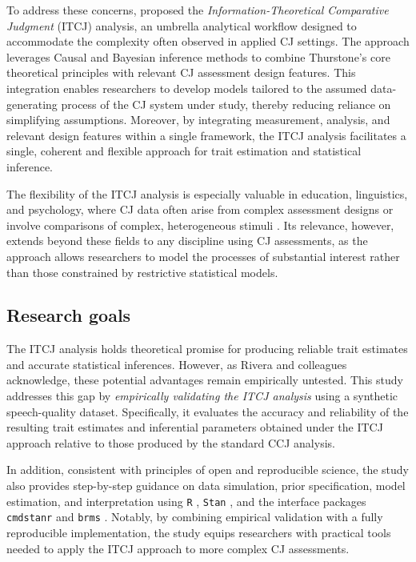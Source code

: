 \documentclass[
  authoryear,
  review,
  1p]{elsarticle}
\begin{document}
To address these concerns, \citet{Rivera_et_al_2025} proposed the
\emph{Information-Theoretical Comparative Judgment} (ITCJ) analysis, an
umbrella analytical workflow designed to accommodate the complexity
often observed in applied CJ settings. The approach leverages Causal and
Bayesian inference methods to combine Thurstone's core theoretical
principles with relevant CJ assessment design features. This integration
enables researchers to develop models tailored to the assumed
data-generating process of the CJ system under study, thereby reducing
reliance on simplifying assumptions. Moreover, by integrating
measurement, analysis, and relevant design features within a single
framework, the ITCJ analysis facilitates a single, coherent and flexible
approach for trait estimation and statistical inference.

The flexibility of the ITCJ analysis is especially valuable in
education, linguistics, and psychology, where CJ data often arise from
complex assessment designs
\citep{Bramley_2008, vanDaal_et_al_2017, Kelly_et_al_2022} or involve
comparisons of complex, heterogeneous stimuli
\citep{vanDaal_et_al_2016, Lesterhuis_et_al_2018, Chambers_et_al_2022}.
Its relevance, however, extends beyond these fields to any discipline
using CJ assessments, as the approach allows researchers to model the
processes of substantial interest rather than those constrained by
restrictive statistical models.

\subsection{Research goals}\label{sec-introduction_goals}

The ITCJ analysis holds theoretical promise for producing reliable trait
estimates and accurate statistical inferences. However, as Rivera and
colleagues \citeyearpar{Rivera_et_al_2025} acknowledge, these potential
advantages remain empirically untested. This study addresses this gap by
\emph{empirically validating the ITCJ analysis} using a synthetic
speech-quality dataset. Specifically, it evaluates the accuracy and
reliability of the resulting trait estimates and inferential parameters
obtained under the ITCJ approach relative to those produced by the
standard CCJ analysis.

In addition, consistent with principles of open and reproducible
science, the study also provides step-by-step guidance on data
simulation, prior specification, model estimation, and interpretation
using \texttt{R} \citep{R_2015}, \texttt{Stan}
\citep{Stan_2026a, Stan_2026b}, and the interface packages
\texttt{cmdstanr} \citep{Gabry_et_al_2025b} and \texttt{brms}
\citep{Burkner_2017, Burkner_2018}. Notably, by combining empirical
validation with a fully reproducible implementation, the study equips
researchers with practical tools needed to apply the ITCJ approach to
more complex CJ assessments.
\end{document}
